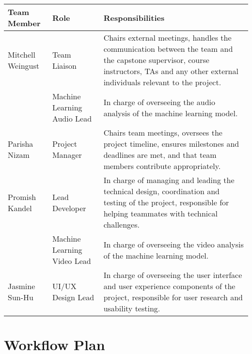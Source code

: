 \documentclass{article}
\begin{document}
\vspace{0.5cm}
\begin{tabularx}{\textwidth}{|l|l|X|}
  \hline
  \textbf{Team Member} & \textbf{Role} & \textbf{Responsibilities} \\
  \hline
  Mitchell Weingust & Team Liaison & Chairs external meetings, handles the communication between the team and the capstone 
  supervisor, course instructors, TAs and any other external individuals relevant to the project.\\
  \cline{2-3} & Machine Learning Audio Lead & In charge of overseeing the audio analysis of the machine learning model.\\
  \hline
  Parisha Nizam & Project Manager & Chairs team meetings, oversees the project timeline, ensures milestones and deadlines 
  are met, and that team members contribute appropriately.\\
  \hline
  Promish Kandel & Lead Developer & In charge of managing and leading the technical design, coordination and testing of the 
  project, responsible for helping teammates with technical challenges. \\
  \cline{2-3} & Machine Learning Video Lead & In charge of overseeing the video analysis of the machine learning model.\\
  \hline
  Jasmine Sun-Hu & UI/UX Design Lead & In charge of overseeing the user interface and user experience components of the project, 
  responsible for user research and usability testing.\\
  \hline
\end{tabularx}

\section{Workflow Plan}
\end{document}
